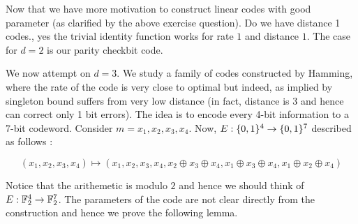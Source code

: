 Now that we have more motivation to construct linear codes with good parameter (as clarified by the above exercise question). Do we have distance 1 codes., yes the trivial identity function works for rate $1$ and distance $1$. The case for $d=2$ is our parity checkbit code.

We now attempt on $d=3$. We study a family of codes constructed by Hamming, where the rate of the code is very close to optimal but indeed, as implied by singleton bound suffers from very low distance (in fact, distance is $3$ and hence can correct only 1 bit errors). The idea is to encode every 4-bit information to a 7-bit codeword. Consider $m=x_1,x_2,x_3,x_4$. Now, $E : \{0,1\}^4 \to \{0,1\}^7$ described as follows :  

$$(x_1,x_2,x_3,x_4) \longmapsto (x_1,x_2,x_3,x_4,x_2 \oplus x_3 \oplus x_4, x_1 \oplus x_3 \oplus x_4, x_1 \oplus x_2 \oplus x_4)$$

Notice that the arithemetic is modulo $2$ and hence we should think of $E: {\mathbb{F}}_2^4 \to {\mathbb{F}}_2^7$. The parameters of the code are not clear directly from the construction and hence we prove the following lemma. 

